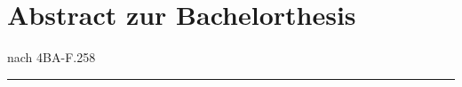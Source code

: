 \cleardoublepage
\section{Abstract zur Bachelorthesis}
    \begin{minipage}{0.5\columnwidth}
        
    \end{minipage}
    \begin{minipage}{0.45\columnwidth}
        \begin{flushright}
            {\small nach 4BA-F.258\\}
        \end{flushright}
    \end{minipage}
    \par\noindent\rule{\columnwidth}{.5pt}


